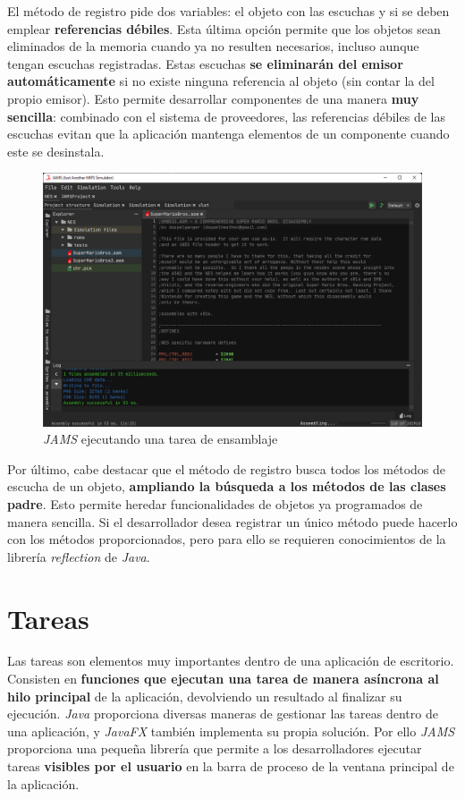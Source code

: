 El método de registro pide dos variables: el objeto
con las escuchas y si se deben emplear \textbf{referencias débiles}.
Esta última opción permite que los objetos sean eliminados de la memoria
cuando ya no resulten necesarios, incluso aunque tengan escuchas registradas.
Estas escuchas \textbf{se eliminarán del emisor automáticamente} si no existe
ninguna referencia al objeto (sin contar la del propio emisor).
Esto permite desarrollar componentes de una manera \textbf{muy sencilla}:
combinado con el sistema de proveedores, las referencias débiles
de las escuchas evitan que la aplicación mantenga elementos de un
componente cuando este se desinstala.

\begin{figure}[h]
    \centering
    \includegraphics[width=\textwidth]{images/tecnologias/jams-assembling}
    \caption{\textit{JAMS} ejecutando una tarea de ensamblaje}
    \label{fig:jams-assembling}
\end{figure}

Por último, cabe destacar que el método de registro
busca todos los métodos de escucha de un objeto,
\textbf{ampliando la búsqueda a los métodos de las clases padre}.
Esto permite heredar funcionalidades de objetos ya programados
de manera sencilla.
Si el desarrollador desea registrar un único método puede hacerlo
con los métodos proporcionados, pero para ello se requieren
conocimientos de la librería \textit{reflection} de \textit{Java}.

\section{Tareas}\label{sec:tareas}

Las tareas son elementos muy importantes dentro de una aplicación
de escritorio.
Consisten en \textbf{funciones que ejecutan una tarea de manera
asíncrona al hilo principal} de la aplicación, devolviendo un
resultado al finalizar su ejecución.
\textit{Java} proporciona diversas maneras de gestionar
las tareas dentro de una aplicación, y \textit{JavaFX}
también implementa su propia solución.
Por ello \textit{JAMS} proporciona una pequeña
librería que permite a los desarrolladores ejecutar
tareas \textbf{visibles por el usuario} en la barra
de proceso de la ventana principal de la aplicación.

